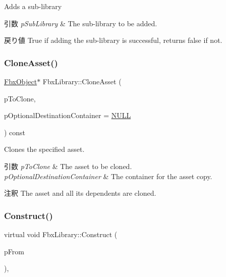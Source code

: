 Adds a sub-\/library 
\begin{DoxyParams}{引数}
{\em p\+Sub\+Library} & The sub-\/library to be added. \\
\hline
\end{DoxyParams}
\begin{DoxyReturn}{戻り値}
{\ttfamily True} if adding the sub-\/library is successful, returns {\ttfamily false} if not. 
\end{DoxyReturn}
\mbox{\label{class_fbx_library_ad1c56ae40f4e371c7e0395ce3362dbcc}} 
\subsubsection{\texorpdfstring{Clone\+Asset()}{CloneAsset()}}
{\footnotesize\ttfamily \hyperlink{class_fbx_object}{Fbx\+Object}$\ast$ Fbx\+Library\+::\+Clone\+Asset (\begin{DoxyParamCaption}\item[{\hyperlink{class_fbx_object}{Fbx\+Object} $\ast$}]{p\+To\+Clone,  }\item[{\hyperlink{class_fbx_object}{Fbx\+Object} $\ast$}]{p\+Optional\+Destination\+Container = {\ttfamily \hyperlink{fbxarch_8h_a070d2ce7b6bb7e5c05602aa8c308d0c4}{N\+U\+LL}} }\end{DoxyParamCaption}) const}

Clones the specified asset. 
\begin{DoxyParams}{引数}
{\em p\+To\+Clone} & The asset to be cloned. \\
\hline
{\em p\+Optional\+Destination\+Container} & The container for the asset copy. \\
\hline
\end{DoxyParams}
\begin{DoxyRemark}{注釈}
The asset and all its dependents are cloned. 
\end{DoxyRemark}
\mbox{\label{class_fbx_library_a8e9fbf97f6753d859411f284db16f964}} 
\subsubsection{\texorpdfstring{Construct()}{Construct()}}
{\footnotesize\ttfamily virtual void Fbx\+Library\+::\+Construct (\begin{DoxyParamCaption}\item[{const \hyperlink{class_fbx_object}{Fbx\+Object} $\ast$}]{p\+From }\end{DoxyParamCaption})\hspace{0.3cm}{\ttfamily [protected]}, {\ttfamily [virtual]}}

